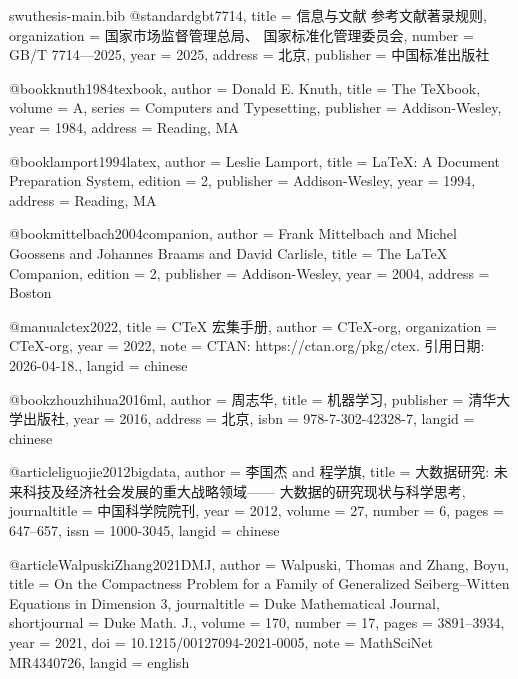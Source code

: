 

\begin{filecontents*}[overwrite]{swuthesis-main.bib}
@standard{gbt7714,
  title        = {信息与文献 参考文献著录规则},
  organization = {国家市场监督管理总局、
    国家标准化管理委员会},
  number       = {GB/T 7714---2025},
  year         = {2025},
  address      = {北京},
  publisher    = {中国标准出版社}
}

@book{knuth1984texbook,
  author    = {Donald E. Knuth},
  title     = {The {\TeX}book},
  volume    = {A},
  series    = {Computers and Typesetting},
  publisher = {Addison-Wesley},
  year      = {1984},
  address   = {Reading, MA}
}

@book{lamport1994latex,
  author    = {Leslie Lamport},
  title     = {{\LaTeX}: A Document Preparation System},
  edition   = {2},
  publisher = {Addison-Wesley},
  year      = {1994},
  address   = {Reading, MA}
}

@book{mittelbach2004companion,
  author    = {Frank Mittelbach and Michel Goossens and Johannes Braams
    and David Carlisle},
  title     = {The {\LaTeX} Companion},
  edition   = {2},
  publisher = {Addison-Wesley},
  year      = {2004},
  address   = {Boston}
}

@manual{ctex2022,
  title        = {{CTeX} 宏集手册},
  author       = {{CTeX-org}},
  organization = {CTeX-org},
  year         = {2022},
  note         = {CTAN: https://ctan.org/pkg/ctex. 引用日期: 2026-04-18.},
  langid       = {chinese}
}

@book{zhouzhihua2016ml,
  author    = {周志华},
  title     = {机器学习},
  publisher = {清华大学出版社},
  year      = {2016},
  address   = {北京},
  isbn      = {978-7-302-42328-7},
  langid    = {chinese}
}

@article{liguojie2012bigdata,
  author       = {李国杰 and 程学旗},
  title        = {大数据研究: 未来科技及经济社会发展的重大战略领域——
    大数据的研究现状与科学思考},
  journaltitle = {中国科学院院刊},
  year         = {2012},
  volume       = {27},
  number       = {6},
  pages        = {647--657},
  issn         = {1000-3045},
  langid       = {chinese}
}

@article{WalpuskiZhang2021DMJ,
  author       = {Walpuski, Thomas and Zhang, Boyu},
  title        = {On the Compactness Problem for a Family of Generalized
    {Seiberg--Witten} Equations in Dimension 3},
  journaltitle = {Duke Mathematical Journal},
  shortjournal = {Duke Math. J.},
  volume       = {170},
  number       = {17},
  pages        = {3891--3934},
  year         = {2021},
  doi          = {10.1215/00127094-2021-0005},
  note         = {MathSciNet MR4340726},
  langid       = {english}
}


\end{filecontents*}
